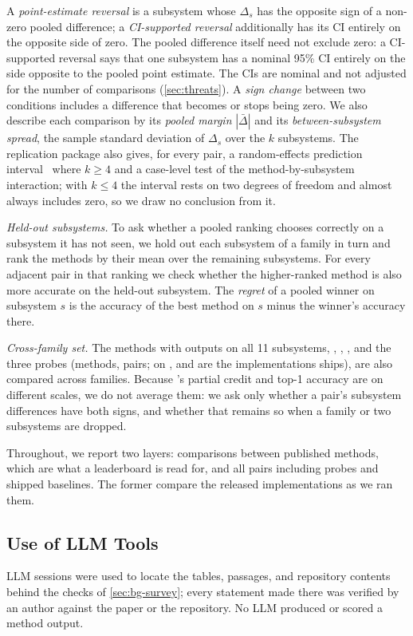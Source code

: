 A \emph{point-estimate reversal} is a subsystem whose $\Delta_s$ has the opposite sign of a non-zero pooled difference; a \emph{CI-supported reversal} additionally has its CI entirely on the opposite side of zero.
The pooled difference itself need not exclude zero: a CI-supported reversal says that one subsystem has a nominal 95\% CI entirely on the side opposite to the pooled point estimate.
The CIs are nominal and not adjusted for the number of comparisons (\cref{sec:threats}).
A \emph{sign change} between two conditions includes a difference that becomes or stops being zero.
We also describe each comparison by its \emph{pooled margin} $|\bar\Delta|$ and its \emph{between-subsystem spread}, the sample standard deviation of $\Delta_s$ over the $k$ subsystems.
The replication package also gives, for every pair, a random-effects prediction interval~\citep{inthout2016plea} where $k \geq 4$ and a case-level test of the method-by-subsystem interaction; with $k \leq 4$ the interval rests on two degrees of freedom and almost always includes zero, so we draw no conclusion from it.

\emph{Held-out subsystems.}
To ask whether a pooled ranking chooses correctly on a subsystem it has not seen, we hold out each subsystem of a family in turn and rank the methods by their mean over the remaining subsystems.
For every adjacent pair in that ranking we check whether the higher-ranked method is also more accurate on the held-out subsystem.
The \emph{regret} of a pooled winner on subsystem $s$ is the accuracy of the best method on $s$ minus the winner's accuracy there.

\emph{Cross-family set.}
The methods with outputs on all 11 subsystems, \baro, \rcd, \ediag, and the three probes (\XNMethods methods, \XNPairs pairs; on \petshop, \rcd and \ediag are the implementations \petshop ships), are also compared across families.
Because \openrca's partial credit and top-1 accuracy are on different scales, we do not average them: we ask only whether a pair's subsystem differences have both signs, and whether that remains so when a family or two subsystems are dropped.

Throughout, we report two layers: comparisons between published methods, which are what a leaderboard is read for, and all pairs including probes and shipped baselines.
The former compare the released implementations as we ran them.

\subsection{Use of LLM Tools}
\label{sec:design-llm}

LLM sessions were used to locate the tables, passages, and repository contents behind the checks of \cref{sec:bg-survey}; every statement made there was verified by an author against the paper or the repository.
No LLM produced or scored a method output.
